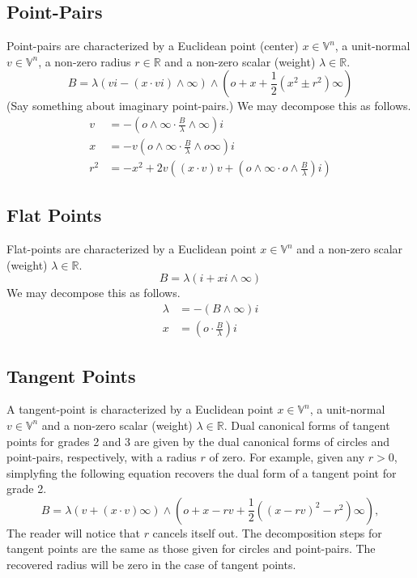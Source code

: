 \documentclass[12pt]{article}
\newcommand{\V}{\mathbb{V}}
\newcommand{\R}{\mathbb{R}}
\newcommand{\nvao}{o}
\newcommand{\nvai}{\infty}
\begin{document}
\subsection{Point-Pairs}

Point-pairs are characterized by a Euclidean point (center) $x\in\V^n$,
a unit-normal $v\in\V^n$, a non-zero radius $r\in\R$ and a non-zero scalar (weight) $\lambda\in\R$.
\begin{equation*}
B = \lambda(vi-(x\cdot vi)\wedge\nvai)\wedge\left(\nvao+x+\frac{1}{2}(x^2\pm r^2)\nvai\right)
\end{equation*}
(Say something about imaginary point-pairs.)  We may decompose this as follows.
\begin{align*}
v &= -\left(\nvao\wedge\nvai\cdot\frac{B}{\lambda}\wedge\nvai\right)i \\
x &= -v\left(\nvao\wedge\nvai\cdot\frac{B}{\lambda}\wedge\nvao\nvai\right)i \\
r^2 &= -x^2+2v\left((x\cdot v)v+\left(\nvao\wedge\nvai\cdot\nvao\wedge\frac{B}{\lambda}\right)i\right)
\end{align*}

\subsection{Flat Points}

Flat-points are characterized by a Euclidean point $x\in\V^n$ and a non-zero
scalar (weight) $\lambda\in\R$.
\begin{equation*}
B = \lambda(i+xi\wedge\nvai)
\end{equation*}
We may decompose this as follows.
\begin{align*}
\lambda &= -(B\wedge\nvai)i \\
x &= \left(\nvao\cdot\frac{B}{\lambda}\right)i
\end{align*}

\subsection{Tangent Points}

A tangent-point is characterized by a Euclidean point $x\in\V^n$, a unit-normal $v\in\V^n$
and a non-zero scalar (weight) $\lambda\in\R$.  Dual canonical forms of tangent points for
grades 2 and 3 are given by the dual canonical forms of circles and point-pairs, respectively,
with a radius $r$ of zero.  For example, given any $r>0$, simplyfing the following equation recovers
the dual form of a tangent point for grade 2.
\begin{equation*}
B = \lambda(v+(x\cdot v)\nvai)\wedge\left(\nvao+x-rv+\frac{1}{2}((x-rv)^2-r^2)\nvai\right),
\end{equation*}
The reader will notice that $r$ cancels itself out.  The decomposition steps for tangent
points are the same as those given for circles and point-pairs.  The recovered radius
will be zero in the case of tangent points.
\end{document}
